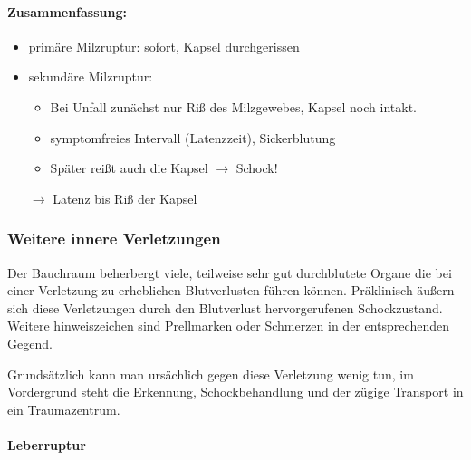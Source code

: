 \paragraph{Zusammenfassung:}
\begin{itemize}
    \item prim\"are Milzruptur: sofort, Kapsel durchgerissen
    \item sekund\"are Milzruptur:
    	\begin{itemize}
		\item Bei Unfall zunächst nur Riß des Milzgewebes, Kapsel noch intakt.
		\item symptomfreies Intervall (Latenzzeit), Sickerblutung
		\item Später reißt auch die Kapsel  ${\rightarrow}$ Schock! 
		\end{itemize} 
    ${\rightarrow}$ Latenz bis Ri{\ss} der Kapsel
\end{itemize}




\subsubsection{Weitere innere Verletzungen}

Der Bauchraum beherbergt viele, teilweise sehr gut
durchblutete Organe die bei einer Verletzung zu erheblichen
Blutverlusten führen können. Präklinisch äußern sich diese
Verletzungen durch den Blutverlust hervorgerufenen
Schockzustand. Weitere hinweiszeichen sind Prellmarken oder
Schmerzen in der entsprechenden Gegend.

Grundsätzlich kann man ursächlich gegen diese Verletzung
wenig tun, im Vordergrund steht die Erkennung,
Schockbehandlung und der zügige Transport in ein
Traumazentrum.

\paragraph{Leberruptur} ~


